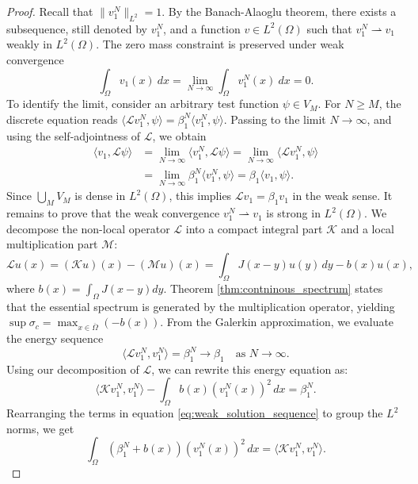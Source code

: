 \documentclass[12pt, a4paper]{article}
\theoremstyle{break}
\theoremstyle{break}
\theoremstyle{break}
\theoremstyle{break}
\theoremstyle{break}
\theoremstyle{break}
\theoremstyle{break}
\theoremstyle{break}
\theoremstyle{break}
\begin{document}
\begin{proof}
    Recall that $\|v_1^N\|_{L^2} = 1$. By the Banach-Alaoglu theorem, there exists a subsequence, still denoted by $v_1^N$, and a function $v \in L^2(\Omega)$ such that $v_1^N \rightharpoonup v_1$ weakly in $L^2(\Omega)$. The zero mass constraint is preserved under weak convergence
    \begin{equation}
        \int_\Omega v_1(x) \:dx = \lim_{N \to \infty} \int_\Omega v_1^N(x) \:dx = 0.
    \end{equation}
    To identify the limit, consider an arbitrary test function $\psi \in V_M$. For $N \geq M$, the discrete equation reads $\langle \mathcal{L} v_1^N, \psi \rangle = \beta_1^N \langle v_1^N, \psi \rangle$. Passing to the limit $N \to \infty$, and using the self-adjointness of $\mathcal{L}$, we obtain
    \begin{align}
        \langle v_1, \mathcal{L} \psi \rangle &= \lim_{N \to \infty} \langle v_1^N, \mathcal{L} \psi \rangle = \lim_{N \to \infty} \langle \mathcal{L} v_1^N, \psi \rangle \\
        &= \lim_{N \to \infty} \beta_1^N \langle v_1^N, \psi \rangle = \beta_1 \langle v_1, \psi \rangle.
    \end{align}
    Since $\bigcup_{M} V_M$ is dense in $L^2(\Omega)$, this implies $\mathcal{L} v_1 = \beta_1 v_1$ in the weak sense. It remains to prove that the weak convergence $v_1^N \rightharpoonup v_1$ is strong in $L^2(\Omega)$. We decompose the non-local operator $\mathcal{L}$ into a compact integral part $\mathcal{K}$ and a local multiplication part $\mathcal{M}$:
    \begin{equation}
        \mathcal{L}u(x) = (\mathcal{K}u)(x) - (\mathcal{M}u)(x) = \int_\Omega J(x-y)u(y)\,dy - b(x)u(x),
    \end{equation}
    where $b(x) = \int_\Omega J(x-y)dy$. Theorem \ref{thm:contninous_spectrum} states that the essential spectrum is generated by the multiplication operator, yielding $\sup \sigma_c = \max_{x \in \overline{\Omega}} (-b(x))$. From the Galerkin approximation, we evaluate the energy sequence
    \begin{equation}
        \langle \mathcal{L} v_1^N, v_1^N \rangle = \beta_1^N \to \beta_1 \quad \text{as } N \to \infty.
    \end{equation}
    Using our decomposition of $\mathcal{L}$, we can rewrite this energy equation as:
    \begin{equation}
        \label{eq:weak_solution_sequence}
        \langle \mathcal{K} v_1^N, v_1^N \rangle - \int_\Omega b(x) (v_1^N(x))^2 \, dx = \beta_1^N.
    \end{equation}
    Rearranging the terms in equation \eqref{eq:weak_solution_sequence} to group the $L^2$ norms, we get
    \begin{equation} \label{eq:rearranged_energy}
        \int_\Omega (\beta_1^N + b(x)) (v_1^N(x))^2 \, dx = \langle \mathcal{K} v_1^N, v_1^N \rangle.
    \end{equation}
    

\end{proof}
\end{document}

